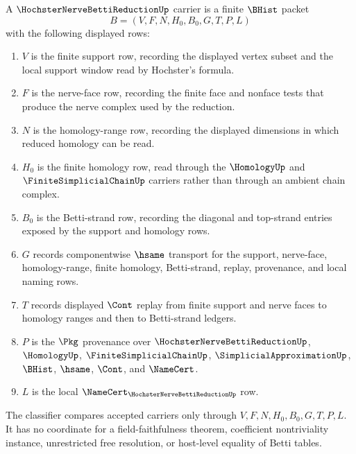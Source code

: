 \begin{definition}
\label{def:hochster-nerve-betti-reduction-carrier}
A $\HochsterNerveBettiReductionUp$ carrier is a finite $\BHist$ packet
$$
B=(V,F,N,H_0,B_0,G,T,P,L)
$$
with the following displayed rows:
\begin{enumerate}
\item $V$ is the finite support row, recording the displayed vertex subset and the local support window read by Hochster's formula.
\item $F$ is the nerve-face row, recording the finite face and nonface tests that produce the nerve complex used by the reduction.
\item $N$ is the homology-range row, recording the displayed dimensions in which reduced homology can be read.
\item $H_0$ is the finite homology row, read through the $\HomologyUp$ and $\FiniteSimplicialChainUp$ carriers rather than through an ambient chain complex.
\item $B_0$ is the Betti-strand row, recording the diagonal and top-strand entries exposed by the support and homology rows.
\item $G$ records componentwise $\hsame$ transport for the support, nerve-face, homology-range, finite homology, Betti-strand, replay, provenance, and local naming rows.
\item $T$ records displayed $\Cont$ replay from finite support and nerve faces to homology ranges and then to Betti-strand ledgers.
\item $P$ is the $\Pkg$ provenance over $\HochsterNerveBettiReductionUp$, $\HomologyUp$, $\FiniteSimplicialChainUp$, $\SimplicialApproximationUp$, $\BHist$, $\hsame$, $\Cont$, and $\NameCert$.
\item $L$ is the local $\NameCert_{\HochsterNerveBettiReductionUp}$ row.
\end{enumerate}
The classifier compares accepted carriers only through $V,F,N,H_0,B_0,G,T,P,L$. It has no coordinate for a field-faithfulness theorem, coefficient nontriviality instance, unrestricted free resolution, or host-level equality of Betti tables.
\end{definition}

